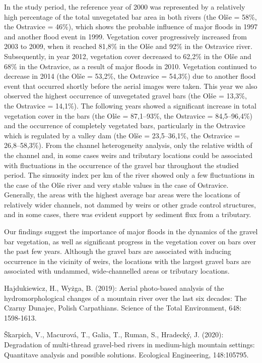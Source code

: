 {In the study period, the reference year of 2000 was represented by a relatively high percentage of the total unvegetated bar area in both rivers (the Olše = 58\%, the Ostravice = 46\%), which shows the probable influence of major floods in 1997 and another flood event in 1999. Vegetation cover progressively increased from 2003 to 2009, when it reached 81,8\% in the Olše and 92\% in the Ostravice river. Subsequently, in year 2012, vegetation cover decreased to 62,2\% in the Olše and 68\% in the Ostravice, as a result of major floods in 2010. Vegetation continued to decrease in 2014 (the Olše = 53,2\%, the Ostravice = 54,3\%) due to another flood event that occurred shortly before the aerial images were taken. This year we also observed the highest occurrence of unvegetated gravel bars (the Olše = 13,3\%, the Ostravice = 14,1\%). The following years showed a significant increase in total vegetation cover in the bars (the Olše = 87,1--93\%, the Ostravice = 84,5--96,4\%) and the occurrence of completely vegetated bars, particularly in the Ostravice which is regulated by a valley dam (the Olše = 23,5--36,1\%, the Ostravice = 26,8--58,3\%). From the channel heterogeneity analysis, only the relative width of the channel and, in some cases weirs and tributary locations could be associated with fluctuations in the occurrence of the gravel bar throughout the studied period. The sinuosity index per km of the river showed only a few fluctuations in the case of the Olše river and very stable values in the case of Ostravice. Generally, the areas with the highest average bar areas were the locations of relatively wider channels, not dammed by weirs or other grade control structures, and in some cases, there was evident support by sediment flux from a tributary.

Our findings suggest the importance of major floods in the dynamics of the gravel bar vegetation, as well as significant progress in the vegetation cover on bars over the past few years. Although the gravel bars are associated with inducing occurrence in the vicinity of weirs, the locations with the largest gravel bars are associated with undammed, wide-channelled areas or tributary locations.
}
{Hajdukiewicz, H., Wyżga, B. (2019): Aerial photo-based analysis of the hydromorphological changes of a mountain river over the last six decades: The Czarny Dunajec, Polish Carpathians. Science of the Total Environment, 648: 1598-1613.

Škarpich, V., Macurová, T., Galia, T., Ruman, S., Hradecký, J. (2020): Degradation of multi-thread gravel-bed rivers in medium-high mountain settings: Quantitave analysis and possible solutions. Ecological Engineering, 148:105795.

}

